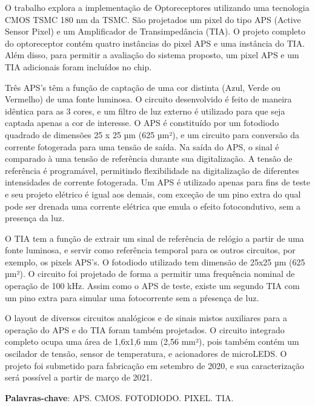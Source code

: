 
\setlength{\absparsep}{18pt} %
\begin{resumo}

O trabalho explora a implementação de Optoreceptores utilizando uma tecnologia CMOS TSMC 180 nm da TSMC. São projetados um pixel do tipo APS (Active Sensor Pixel) e
um Amplificador de Transimpedância (TIA). O projeto completo do optoreceptor contém quatro instâncias do pixel APS e uma instância do TIA. Além disso, para permitir a avaliação do sistema proposto, um pixel APS e um TIA adicionais foram incluídos no chip.

Três APS’s t\^em a função de captação de uma cor distinta (Azul, Verde ou Vermelho) de uma fonte luminosa. O circuito desenvolvido é feito de maneira idêntica para as 3 cores, e um filtro de luz externo é utilizado para que seja captada apenas a cor de interesse. O APS é constituído por um fotodiodo quadrado de dimensões 25 x 25 µm (625 µm²), e um circuito para conversão da corrente fotogerada para uma tensão de saída. Na saída do APS, o sinal é comparado à uma tensão de referência durante sua digitalização. A tensão de referência é programável, permitindo flexibilidade na digitalização de diferentes intensidades de corrente fotogerada. Um APS é utilizado apenas para fins de teste e seu projeto elétrico é igual aos demais, com exceção de um pino extra do qual pode ser drenada uma corrente elétrica que emula o efeito fotocondutivo, sem a presença da luz.

O TIA tem a função de extrair um sinal de referência de relógio a partir de uma fonte luminosa, e servir como referência temporal para os outros circuitos, por exemplo, os pixels APS’s. O fotodiodo utilizado tem dimensão de 25x25 µm (625 µm²). O circuito foi projetado de forma a permitir uma frequência nominal de operação de 100 kHz. Assim como o APS de teste, existe um segundo TIA com um pino extra para simular uma fotocorrente sem a pŕesença de luz.

O layout de diversos circuitos analógicos e de sinais mistos auxiliares para a operação do APS e do TIA foram também projetados. O circuito integrado completo ocupa uma área de 1,6x1,6 mm (2,56 mm²), pois também contém um oscilador de tensão, sensor de temperatura, e acionadores de microLEDS. O projeto foi submetido para fabricação em setembro de 2020, e sua caracterização será possível a partir de março de 2021.

\vspace{\onelineskip}
 
   \noindent 

 \textbf{Palavras-chave}: APS. CMOS. FOTODIODO. PIXEL. TIA.
\end{resumo}